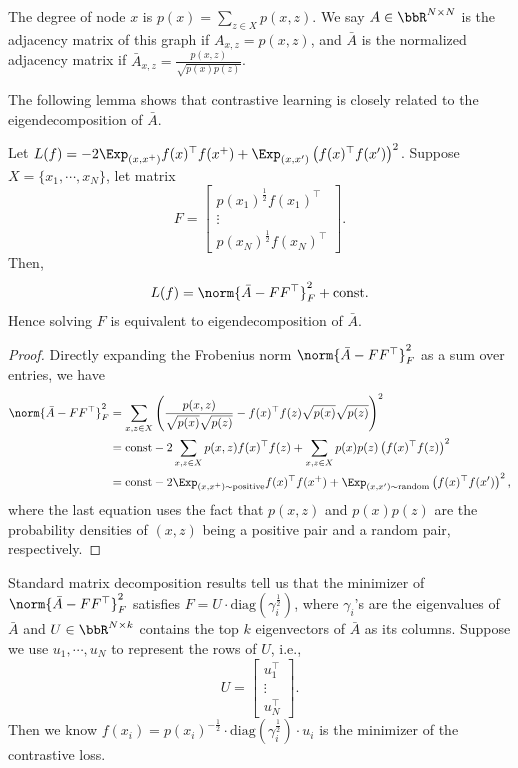 The degree of node $x$ is $p(x) = \sum_{z\in X} p(x, z)$.  We say $A\in\bbR^{N\times N}$ is the adjacency matrix of this graph if $A_{x, z} = p(x, z)$, and $\bar{A}$ is the normalized adjacency matrix if $\bar{A}_{x, z} = \frac{p(x, z)}{\sqrt{p(x)p(z)}}$. 

The following lemma shows that contrastive learning is closely related to the eigendecomposition of $\bar{A}$. 
\begin{lemma}
	Let $L(f) = -2\Exp_{(x, x^+) } f(x)^\top f(x^+) + \Exp_{(x, x') } \left(f(x)^\top f(x')\right)^2$.  Suppose $X=\{x_1, \cdots, x_N\}$, let matrix 
	\begin{equation}
	    F = \begin{bmatrix}  p(x_1)^{\frac{1}{2}} f(x_1)^\top  \\ \vdots \\  p(x_N)^{\frac{1}{2}} f(x_N)^\top \end{bmatrix}.
	\end{equation}
	Then,
	\begin{align}
		L(f) = \norm{\bar{A}-FF^\top}_F^2 +\text{const}.
	\end{align}
	Hence solving $F$ is equivalent to eigendecomposition of $\bar{A}$. 
\end{lemma}
\begin{proof}
Directly expanding the Frobenius norm $\norm{\bar{A}-FF^\top}_F^2$ as a sum over entries, we have
\begin{align}
	\norm{\bar{A} - FF^\top}_F^2 &= \sum_{x, z\in X} \left(\frac{p(x, z)}{\sqrt{p(x)}\sqrt{p(z)}} - f(x)^\top f(z) \sqrt{p(x)}\sqrt{p(z)}\right)^2\\
	&= \text{const} -2 \sum_{x, z\in X} p(x, z) f(x)^\top f(z) + \sum_{x, z\in X}p(x)p(z)\left(f(x)^\top f(z)\right)^2\\
	&= \text{const} -2\Exp_{(x, x^+) \sim\text{positive}} f(x)^\top f(x^+) + \Exp_{(x, x') \sim\text{random}}  \left(f(x)^\top f(x')\right)^2,
\end{align}
where the last equation uses the fact that $p(x, z)$ and $p(x)p(z)$ are the probability densities of $(x,z)$ being a positive pair and a random pair, respectively. 
\end{proof}

Standard matrix decomposition results tell us that the minimizer of $\norm{\bar{A}-FF^\top}_F^2 $ satisfies $F = U \cdot \text{diag}(\gamma_i^{\frac{1}{2}})$, where $\gamma_i$'s are the eigenvalues of $\bar{A}$ and $U\in\bbR^{N\times k}$ contains the top $k$ eigenvectors of $\bar{A}$ as its columns. Suppose we use $u_1, \cdots, u_N$ to represent the rows of $U$, i.e., 
	\begin{equation}
	U = \begin{bmatrix}  u_1^\top  \\ \vdots \\  u_N^\top \end{bmatrix}.
\end{equation}
Then we know $f(x_i)= p(x_i)^{-\frac{1}{2}} \cdot \text{diag}(\gamma_i^{\frac{1}{2}}) \cdot u_i$ is the minimizer of the contrastive loss. 

